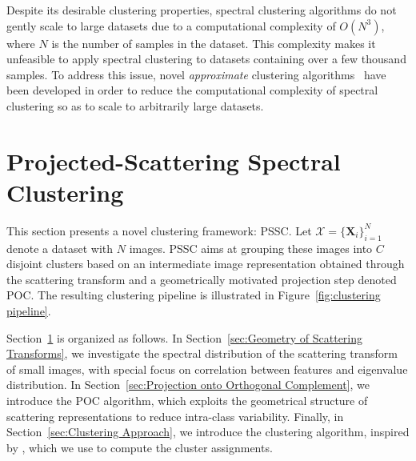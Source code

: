 \documentclass[11pt]{article}
\theoremstyle{definition}
\newcommand{\ImageDataset}{\mathcal{X}}
\newcommand{\Image}{\mathbf{X}}
\newcommand{\NumClusters}{C}
\newcommand{\Figure}[1]{Figure~\ref{#1}}
\newcommand{\Section}[1]{Section~\ref{#1}}
\begin{document}
Despite its desirable clustering properties, spectral clustering algorithms do not gently scale to large datasets due to a computational complexity of $O(N^3)$, where $N$ is the number of samples in the dataset. This complexity makes it unfeasible to apply spectral clustering to datasets containing over a few thousand samples. To address this issue, novel \emph{approximate} clustering algorithms~\cite{Huang_UltraScalableSpectralClustering_2019, Yan_FastApproximateSpectralClustering_2009, He_FastSpectralClusteringExplicitFeatureMapping_2018} have been developed in order to reduce the computational complexity of spectral clustering so as to scale to arbitrarily large datasets.



\section{Projected-Scattering Spectral Clustering}\label{sec:Scattering Projected Spectral Clustering}

This section presents a novel clustering framework: PSSC. Let $\ImageDataset = \{\Image_i\}_{i=1}^N$ denote a dataset with $N$ images. PSSC aims at grouping these images into $\NumClusters$ disjoint clusters based on an intermediate image representation obtained through the scattering transform and a geometrically motivated projection step denoted POC. The resulting clustering pipeline is illustrated in \Figure{fig:clustering pipeline}.

\Section{sec:Scattering Projected Spectral Clustering} is organized as follows. In \Section{sec:Geometry of Scattering Transforms}, we investigate the spectral distribution of the scattering transform of small images, with special focus on correlation between features and eigenvalue distribution. In \Section{sec:Projection onto Orthogonal Complement}, we introduce the POC algorithm, which exploits the geometrical structure of scattering representations to reduce intra-class variability. Finally, in \Section{sec:Clustering Approach}, we introduce the clustering algorithm, inspired by \cite{Huang_UltraScalableSpectralClustering_2019}, which we use to compute the cluster assignments.
\end{document}
